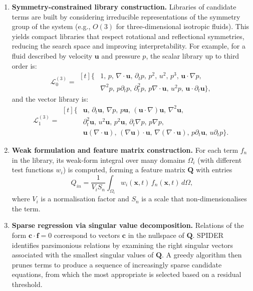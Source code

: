 \documentclass[preprint,12pt]{elsarticle}
\begin{document}
\begin{enumerate}
    \item \textbf{Symmetry-constrained library construction.} Libraries of candidate terms are built by considering irreducible representations of the symmetry group of the system (e.g., $O(3)$ for three-dimensional isotropic fluids). This yields compact libraries that respect rotational and reflectional symmetries, reducing the search space and improving interpretability. For example, for a fluid described by velocity $\mathbf{u}$ and pressure $p$, the scalar library up to third order is:
    \begin{equation}
    \label{eq:scalar-library}
    \mathcal{L}_0^{(3)} = \begin{aligned}[t]
    \{&1,\,p,\,\nabla\cdot\mathbf{u},\,\partial_t p,\,p^2,\,u^2,\,p^3,\,\mathbf{u}\cdot\nabla p,\\
    &\nabla^2 p,\,p\partial_t p,\,\partial_t^2 p,\,p\nabla\cdot\mathbf{u},\,u^2 p,\,\mathbf{u}\cdot\partial_t\mathbf{u}\},
    \end{aligned}
    \end{equation}
    and the vector library is:
    \begin{equation}
    \label{eq:vector-library}
    \mathcal{L}_1^{(3)} = \begin{aligned}[t]
    \{&\mathbf{u},\,\partial_t\mathbf{u},\,\nabla p,\,p\mathbf{u},\,(\mathbf{u}\cdot\nabla)\mathbf{u},\,\nabla^2\mathbf{u},\\
    &\partial_t^2\mathbf{u},\,u^2\mathbf{u},\,p^2\mathbf{u},\,\partial_t\nabla p,\,p\nabla p,\\
    &\mathbf{u}(\nabla\cdot\mathbf{u}),\,(\nabla\mathbf{u})\cdot\mathbf{u},\,\nabla(\nabla\cdot\mathbf{u}),\,p\partial_t\mathbf{u},\,u\partial_t p\}.
    \end{aligned}
    \end{equation}
    
    \item \textbf{Weak formulation and feature matrix construction.} For each term $f_n$ in the library, its weak-form integral over many domains $\Omega_i$ (with different test functions $w_i$) is computed, forming a feature matrix $\mathbf{Q}$ with entries
    \begin{equation}
    \label{eq:feature-matrix}
    Q_{in} = \frac{1}{V_i S_n}\int_{\Omega_i} w_i(\mathbf{x},t)\,f_n(\mathbf{x},t)\,d\Omega,
    \end{equation}
    where $V_i$ is a normalisation factor and $S_n$ is a scale that non-dimensionalises the term.
    
    \item \textbf{Sparse regression via singular value decomposition.} Relations of the form $\mathbf{c}\cdot\mathbf{f}=0$ correspond to vectors $\mathbf{c}$ in the nullspace of $\mathbf{Q}$. SPIDER identifies parsimonious relations by examining the right singular vectors associated with the smallest singular values of $\mathbf{Q}$. A greedy algorithm then prunes terms to produce a sequence of increasingly sparse candidate equations, from which the most appropriate is selected based on a residual threshold.
\end{enumerate}
\end{document}

